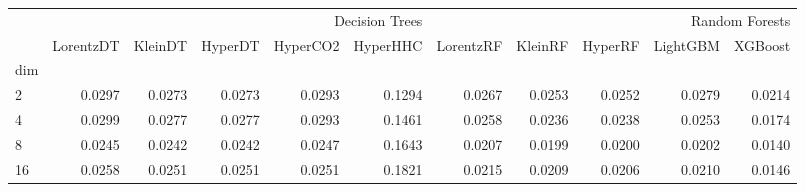 \begin{tabular}{lrrrrrrrrrr}
 & \multicolumn{5}{r}{Decision Trees} & \multicolumn{5}{r}{Random Forests} \\
 & LorentzDT & KleinDT & HyperDT & HyperCO2 & HyperHHC & LorentzRF & KleinRF & HyperRF & LightGBM & XGBoost \\
dim &  &  &  &  &  &  &  &  &  &  \\
2 & {\cellcolor[HTML]{F3FAF0}} \color[HTML]{000000} 0.0297 & {\cellcolor[HTML]{B4E1AD}} \color[HTML]{000000} 0.0273 & {\cellcolor[HTML]{B5E1AE}} \color[HTML]{000000} 0.0273 & {\cellcolor[HTML]{ECF8E8}} \color[HTML]{000000} 0.0293 & {\cellcolor[HTML]{F7FCF5}} \color[HTML]{000000} 0.1294 & {\cellcolor[HTML]{A0D99B}} \color[HTML]{000000} 0.0267 & {\cellcolor[HTML]{60BA6C}} \color[HTML]{F1F1F1} 0.0253 & {\cellcolor[HTML]{5BB86A}} \color[HTML]{F1F1F1} 0.0252 & {\cellcolor[HTML]{CAEAC3}} \color[HTML]{000000} 0.0279 & {\cellcolor[HTML]{00441B}} \color[HTML]{F1F1F1} 0.0214 \\
4 & {\cellcolor[HTML]{F6FCF4}} \color[HTML]{000000} 0.0299 & {\cellcolor[HTML]{D7EFD1}} \color[HTML]{000000} 0.0277 & {\cellcolor[HTML]{D8F0D2}} \color[HTML]{000000} 0.0277 & {\cellcolor[HTML]{F0F9EC}} \color[HTML]{000000} 0.0293 & {\cellcolor[HTML]{F7FCF5}} \color[HTML]{000000} 0.1461 & {\cellcolor[HTML]{AFDFA8}} \color[HTML]{000000} 0.0258 & {\cellcolor[HTML]{72C375}} \color[HTML]{000000} 0.0236 & {\cellcolor[HTML]{78C679}} \color[HTML]{000000} 0.0238 & {\cellcolor[HTML]{A3DA9D}} \color[HTML]{000000} 0.0253 & {\cellcolor[HTML]{00441B}} \color[HTML]{F1F1F1} 0.0174 \\
8 & {\cellcolor[HTML]{ABDDA5}} \color[HTML]{000000} 0.0245 & {\cellcolor[HTML]{A5DB9F}} \color[HTML]{000000} 0.0242 & {\cellcolor[HTML]{A4DA9E}} \color[HTML]{000000} 0.0242 & {\cellcolor[HTML]{AEDEA7}} \color[HTML]{000000} 0.0247 & {\cellcolor[HTML]{F7FCF5}} \color[HTML]{000000} 0.1643 & {\cellcolor[HTML]{53B466}} \color[HTML]{F1F1F1} 0.0207 & {\cellcolor[HTML]{40AA5D}} \color[HTML]{F1F1F1} 0.0199 & {\cellcolor[HTML]{40AA5D}} \color[HTML]{F1F1F1} 0.0200 & {\cellcolor[HTML]{46AE60}} \color[HTML]{F1F1F1} 0.0202 & {\cellcolor[HTML]{00441B}} \color[HTML]{F1F1F1} 0.0140 \\
16 & {\cellcolor[HTML]{C1E6BA}} \color[HTML]{000000} 0.0258 & {\cellcolor[HTML]{B2E0AC}} \color[HTML]{000000} 0.0251 & {\cellcolor[HTML]{B2E0AC}} \color[HTML]{000000} 0.0251 & {\cellcolor[HTML]{B2E0AC}} \color[HTML]{000000} 0.0251 & {\cellcolor[HTML]{F7FCF5}} \color[HTML]{000000} 0.1821 & {\cellcolor[HTML]{5EB96B}} \color[HTML]{F1F1F1} 0.0215 & {\cellcolor[HTML]{4EB264}} \color[HTML]{F1F1F1} 0.0209 & {\cellcolor[HTML]{46AE60}} \color[HTML]{F1F1F1} 0.0206 & {\cellcolor[HTML]{52B365}} \color[HTML]{F1F1F1} 0.0210 & {\cellcolor[HTML]{00441B}} \color[HTML]{F1F1F1} 0.0146 \\

\end{tabular}
